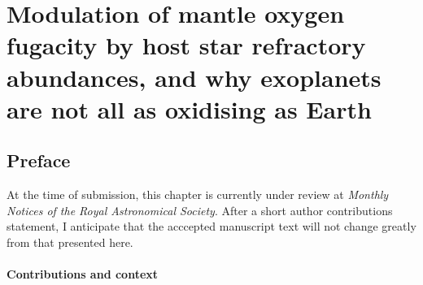 \chapter[Modulation of mantle oxygen fugacity by host star refractory abundances]{Modulation of mantle oxygen fugacity by host star refractory abundances, and why exoplanets are not all as oxidising as Earth}
\label{chapter:fo2}

\ifpdf
    \graphicspath{{Chapter4/Figs/Raster/}{Chapter4/Figs/PDF/}{Chapter4/Figs/}}
\else
    \graphicspath{{Chapter4/Figs/Vector/}{Chapter4/Figs/}}
\fi



\section*{Preface}

At the time of submission, this chapter is currently under review at \textit{Monthly Notices of the Royal Astronomical Society}. After a short author contributions statement, I anticipate that the acccepted manuscript text will not change greatly from that presented here.


\subsubsection*{Contributions and context}

